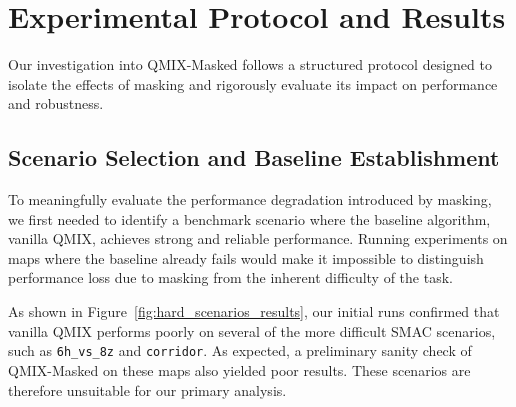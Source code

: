 \documentclass[../Main.tex]{subfiles}
\begin{document}
\section{Experimental Protocol and Results}

Our investigation into QMIX-Masked follows a structured protocol designed to isolate the effects of masking and rigorously evaluate its impact on performance and robustness.

\subsection{Scenario Selection and Baseline Establishment}
To meaningfully evaluate the performance degradation introduced by masking, we first needed to identify a benchmark scenario where the baseline algorithm, vanilla QMIX, achieves strong and reliable performance. Running experiments on maps where the baseline already fails would make it impossible to distinguish performance loss due to masking from the inherent difficulty of the task.

As shown in Figure~\ref{fig:hard_scenarios_results}, our initial runs confirmed that vanilla QMIX performs poorly on several of the more difficult SMAC scenarios, such as \texttt{6h\_vs\_8z} and \texttt{corridor}. As expected, a preliminary sanity check of QMIX-Masked on these maps also yielded poor results. These scenarios are therefore unsuitable for our primary analysis.
\end{document}
